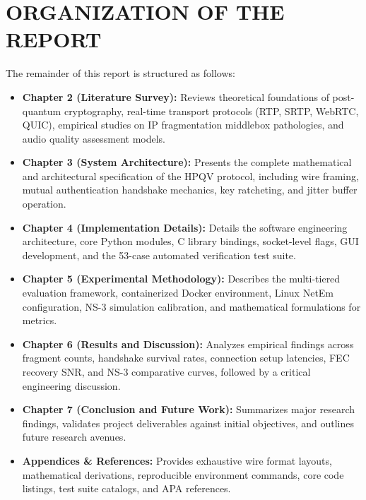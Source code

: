 \section{ORGANIZATION OF THE REPORT}
The remainder of this report is structured as follows:
\begin{itemize}
    \item \textbf{Chapter 2 (Literature Survey):} Reviews theoretical foundations of post-quantum cryptography, real-time transport protocols (RTP, SRTP, WebRTC, QUIC), empirical studies on IP fragmentation middlebox pathologies, and audio quality assessment models.
    \item \textbf{Chapter 3 (System Architecture):} Presents the complete mathematical and architectural specification of the HPQV protocol, including wire framing, mutual authentication handshake mechanics, key ratcheting, and jitter buffer operation.
    \item \textbf{Chapter 4 (Implementation Details):} Details the software engineering architecture, core Python modules, C library bindings, socket-level flags, GUI development, and the 53-case automated verification test suite.
    \item \textbf{Chapter 5 (Experimental Methodology):} Describes the multi-tiered evaluation framework, containerized Docker environment, Linux NetEm configuration, NS-3 simulation calibration, and mathematical formulations for metrics.
    \item \textbf{Chapter 6 (Results and Discussion):} Analyzes empirical findings across fragment counts, handshake survival rates, connection setup latencies, FEC recovery SNR, and NS-3 comparative curves, followed by a critical engineering discussion.
    \item \textbf{Chapter 7 (Conclusion and Future Work):} Summarizes major research findings, validates project deliverables against initial objectives, and outlines future research avenues.
    \item \textbf{Appendices \& References:} Provides exhaustive wire format layouts, mathematical derivations, reproducible environment commands, core code listings, test suite catalogs, and APA references.
\end{itemize}
